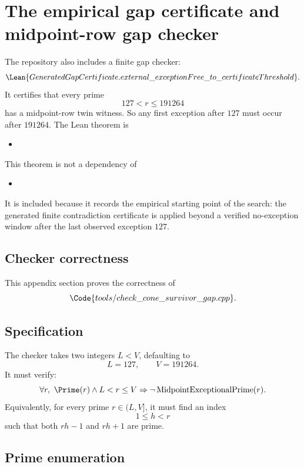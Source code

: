 \clearpage
\section{The empirical gap certificate and midpoint-row gap checker}
\label{app:gap}
\noindent

The repository also includes a finite gap checker:
\[
  \Lean{GeneratedGapCertificate.external\_exceptionFree\_to\_certificateThreshold}.
\]
It certifies that every prime
\[
  127<r\le 191264
\]
has a midpoint-row twin witness.  So any first exception after \(127\)
must occur after \(191264\).  The Lean theorem is
\begin{itemize}[leftmargin=1.5em,itemsep=0.15em]
  \item {}
\end{itemize}

This theorem is not a dependency of
\begin{itemize}[leftmargin=1.5em,itemsep=0.15em]
  \item {}
\end{itemize}
It is included because it records the empirical starting point of the search:
the generated finite contradiction certificate is applied beyond a verified
no-exception window after the last observed exception \(127\).

\subsection{Checker correctness}

This appendix section proves the correctness of
\[
  \Code{tools/check\_cone\_survivor\_gap.cpp}.
\]

\subsection{Specification}

The checker takes two integers \(L<V\), defaulting to
\[
  L=127,\qquad V=191264.
\]
It must verify:
\[
  \forall r,\ \Prime(r)\wedge L<r\le V
  \Rightarrow \neg\operatorname{MidpointExceptionalPrime}(r).
\]
Equivalently, for every prime \(r\in(L,V]\), it must find an index
\[
  1\le h<r
\]
such that both \(rh-1\) and \(rh+1\) are prime.

\subsection{Prime enumeration}

